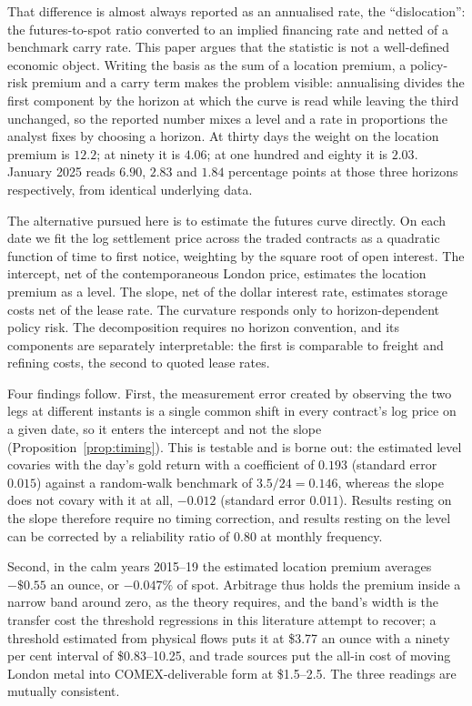 \documentclass[11pt,a4paper]{article}
\begin{document}
That difference is almost always reported as an annualised rate, the
``dislocation'': the futures-to-spot ratio converted to an implied financing
rate and netted of a benchmark carry rate. This paper argues that the statistic
is not a well-defined economic object. Writing the basis as the sum of a
location premium, a policy-risk premium and a carry term makes the problem
visible: annualising divides the first component by the horizon at which the
curve is read while leaving the third unchanged, so the reported number mixes a
level and a rate in proportions the analyst fixes by choosing a horizon. At
thirty days the weight on the location premium is $12.2$; at ninety it is
$4.06$; at one hundred and eighty it is $2.03$. January 2025 reads $6.90$,
$2.83$ and $1.84$ percentage points at those three horizons respectively, from
identical underlying data.

The alternative pursued here is to estimate the futures curve directly. On each
date we fit the log settlement price across the traded contracts as a quadratic
function of time to first notice, weighting by the square root of open
interest. The intercept, net of the contemporaneous London price, estimates the
location premium as a level. The slope, net of the dollar interest rate,
estimates storage costs net of the lease rate. The curvature responds only to
horizon-dependent policy risk. The decomposition requires no horizon
convention, and its components are separately interpretable: the first is
comparable to freight and refining costs, the second to quoted lease rates.

Four findings follow. First, the measurement error created by observing the two
legs at different instants is a single common shift in every contract's log
price on a given date, so it enters the intercept and not the slope
(Proposition~\ref{prop:timing}). This is testable and is borne out: the
estimated level covaries with the day's gold return with a coefficient of
$0.193$ (standard error $0.015$) against a random-walk benchmark of
$3.5/24=0.146$, whereas the slope does not covary with it at all, $-0.012$
(standard error $0.011$). Results resting on the slope therefore require no
timing correction, and results resting on the level can be corrected by a
reliability ratio of $0.80$ at monthly frequency.

Second, in the calm years 2015--19 the estimated location premium averages
$-\$0.55$ an ounce, or $-0.047\%$ of spot. Arbitrage thus holds the premium
inside a narrow band around zero, as the theory requires, and the band's width
is the transfer cost the threshold regressions in this literature attempt to
recover; a threshold estimated from physical flows puts it at \$3.77 an ounce
with a ninety per cent interval of \$0.83--10.25, and trade sources put the
all-in cost of moving London metal into COMEX-deliverable form at \$1.5--2.5.
The three readings are mutually consistent.
\end{document}
